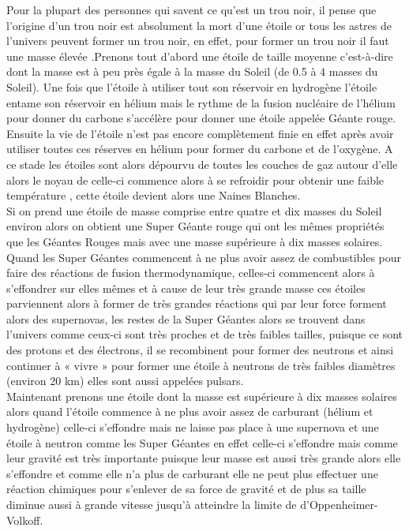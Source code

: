 	
	Pour la plupart des personnes qui savent ce qu’est un trou noir, il pense que l’origine d’un trou noir est absolument la mort d’une étoile or tous les astres de l’univers peuvent former un trou noir, en effet, pour former un trou noir il faut une masse élevée .Prenons tout d’abord une étoile de taille moyenne c'est-à-dire dont la masse est à peu près égale à la masse du Soleil (de 0.5 à 4 masses du Soleil). Une fois que l’étoile à utiliser tout son réservoir en hydrogène l’étoile entame son réservoir en hélium mais le rythme de la fusion nucléaire de l’hélium pour donner du carbone s’accélère pour donner une étoile appelée Géante rouge.  Ensuite la vie de l’étoile n’est pas encore complètement finie en effet après avoir utiliser toutes ces réserves en hélium pour former du carbone et de l’oxygène. A ce stade les étoiles sont alors dépourvu de toutes les couches de gaz autour d’elle alors le noyau de celle-ci commence alors à se refroidir pour obtenir une faible température , cette étoile devient alors une Naines Blanches.\\ 
	Si on prend une étoile de masse comprise entre quatre et dix masses du Soleil environ alors on obtient une Super Géante rouge qui ont les mêmes propriétés que les Géantes Rouges mais avec une masse supérieure à dix masses solaires. Quand les Super Géantes commencent à ne plus avoir assez de combustibles pour faire des réactions de fusion thermodynamique, celles-ci commencent alors à s’effondrer sur elles mêmes et à cause de leur très grande masse ces étoiles parviennent alors à former de très grandes réactions qui par leur force forment alors des supernovas, les restes de la Super Géantes alors se trouvent dans l’univers comme ceux-ci sont très proches et de très faibles tailles, puisque ce sont des protons et des électrons, il se recombinent pour former des neutrons et ainsi continuer à « vivre » pour former une étoile à neutrons de très faibles diamètres (environ 20 km) elles sont aussi appelées pulsars.\\
	Maintenant prenons une étoile dont la masse est supérieure à dix masses solaires alors quand l’étoile commence à ne plus avoir assez de carburant (hélium et hydrogène) celle-ci s’effondre mais ne laisse pas place à une supernova et une étoile à neutron comme les Super Géantes en effet celle-ci s’effondre mais comme leur gravité est très importante puisque leur masse est aussi très grande alors elle s’effondre et comme elle n’a plus de carburant elle ne peut plus effectuer une réaction chimiques pour s’enlever de sa force de gravité et de plus sa taille diminue aussi à grande vitesse jusqu’à atteindre la limite de d’Oppenheimer- Volkoff.\\
